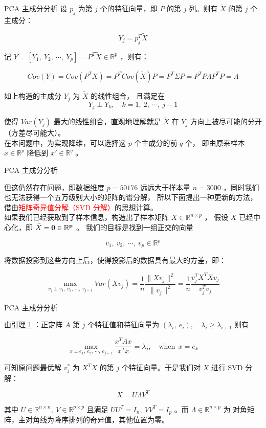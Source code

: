 \documentclass[11pt]{beamer}
\begin{document}
\begin{frame}{PCA 主成分分析}{}
\fontsize{9pt}{11pt}\selectfont
设 $p_j$ 为第 $j$ 个的特征向量，即 $P$ 的第 $j$ 列。则有 $\widetilde{X}$ 的第 $j$ 个主成分：

$$
Y_j = p_j^T \widetilde{X}
$$

记 $Y = \left[Y_1,\ Y_2,\ \cdots,\ Y_p\right] = P^T \widetilde{X} \in \mathbb{R}^p$ ，则有：

$$
Cov(Y) = Cov(P^T X) = P^T Cov(\widetilde{X}) P = P^T \Sigma P = P^TP\Lambda P^TP = \Lambda
$$

如上构造的主成分 $Y_j$ 为 $\widetilde{X}$ 的线性组合，
且满足在 
$$
Y_j \perp Y_k,\quad k = 1,\ 2,\ \cdots,\ j-1
$$

使得 $Var(Y_j)$ 最大的线性组合，直观地理解就是 $\widetilde{X}$ 在 $Y_j$ 
方向上被尽可能的分开（方差尽可能大）。\\[0.5em]

在本问题中，为实现降维，可以选择这 $p$ 个主成分的前 $q$ 个，
即由原来样本 $x \in \mathbb{R}^p$ 降低到 $x' \in \mathbb{R}^q$ 。

\end{frame}


\begin{frame}{PCA 主成分分析}{}
\fontsize{9pt}{11pt}\selectfont

但这仍然存在问题，即数据维度 $p = 50176$ 远远大于样本量 $n = 3000$ ，同时我们也无法获得一个五万级别大小的矩阵的谱分解，
所以下面提出一种更新的方法，借由\textcolor{red}{矩阵奇异值分解（SVD 分解）}的思想计算。\\[0.5em]

如果我们已经获取到了样本信息，构造出了样本矩阵 $X \in \mathbb{R}^{n\times p}$ ，
假设 $X$ 已经中心化，即 $\bar{X} = \bf{0} \in \mathbb{R}^p$ 。
我们的目标是找到一组正交的向量 

$$
v_1,\ v_2,\ \cdots,\ v_p \in \mathbb{R}^p
$$

将数据投影到这些方向上后，使得投影后的数据具有最大的方差，即：

$$
\max_{v_j \perp v_1,\ v_2,\ \cdots,\ v_{j-1}} Var(Xv_j) = \frac{1}{n} \frac{\|Xv_j\|^2}{\|v_j\|^2} = \frac{1}{n} \frac{v_j^T X^T X v_j}{v_j^Tv_j}
$$

\end{frame}

\begin{frame}{PCA 主成分分析}{}
\fontsize{9pt}{11pt}\selectfont

由\uline{引理 1} ：正定阵 $A$ 第 $j$ 个特征值和特征向量为 $(\lambda_i,\ e_i),\quad \lambda_i \geq \lambda_{i+1}$ 则有

$$
\max_{x \perp e_1,\ e_2,\ \cdots,\ e_{j-1}} \frac{x^TAx}{x^Tx} = \lambda_j,\quad \text{when}\ \ x = e_{k}
$$

可知原问题最优解 $v_j^*$ 为 $X^TX$ 的第 $j$ 个特征向量。于是我们对 $X$ 进行 SVD 分解：

$$
X = U \Lambda V^T
$$

其中 $U \in \mathbb{R}^{n\times n},\ V \in \mathbb{R}^{p \times p}$ 
且满足 $UU^T = I_n,\ VV^T = I_p$ 。而 $\Lambda \in \mathbb{R}^{n \times p}$ 为
对角矩阵，主对角线为降序排列的奇异值，其他位置为零。

\end{frame}
\end{document}
